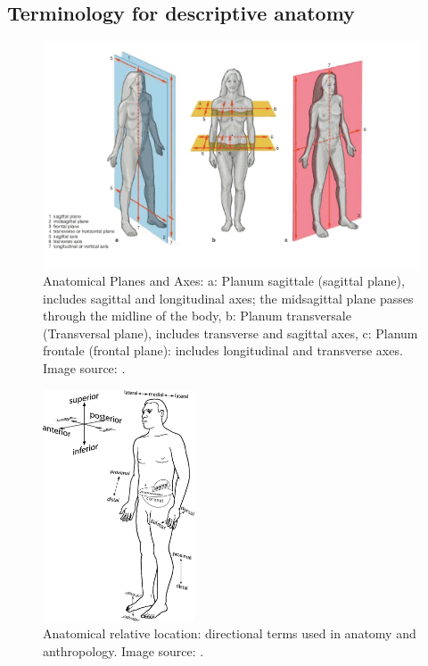 \documentclass[sw]{iosart2x}
\begin{document}
\subsection{Terminology for descriptive anatomy}

\begin{figure}
\includegraphics[width=\textwidth]{img/axisplane.png}
\caption{
Anatomical Planes and Axes:
a: Planum sagittale (sagittal plane), includes sagittal and longitudinal axes; the midsagittal plane passes through the midline of the body,
b: Planum transversale (Transversal plane), includes transverse and sagittal axes,
c: Planum frontale (frontal plane): includes longitudinal and transverse axes.
Image source: \citep{allgemeineanatomieen}.
}
\label{fig:axisplane}
\end{figure}

\begin{figure}
\includegraphics[width=0.4\textwidth]{img/relativelocation.png}
\caption{
Anatomical relative location: directional terms used in anatomy and anthropology.
Image source: \cite{schemamann}.
}
\label{fig:relativelocation}
\end{figure}
\end{document}
